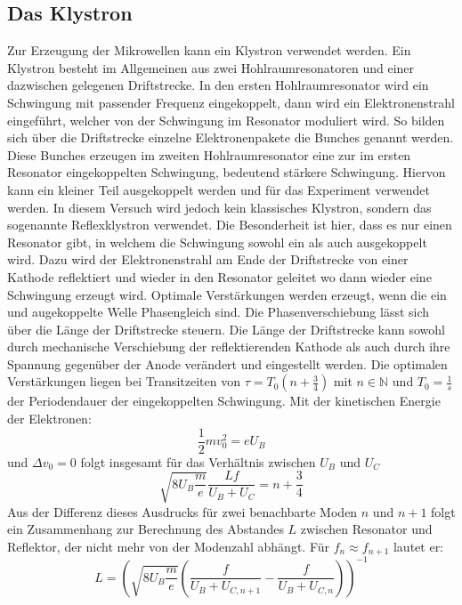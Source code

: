 \subsection{Das Klystron}
\label{sec:thklystron}
Zur Erzeugung der Mikrowellen kann ein Klystron verwendet werden. Ein Klystron besteht im Allgemeinen 
aus zwei Hohlraumresonatoren und einer dazwischen gelegenen Driftstrecke. In den ersten Hohlraumresonator 
wird ein Schwingung mit passender Frequenz eingekoppelt, dann wird ein Elektronenstrahl eingeführt, welcher 
von der Schwingung im Resonator moduliert wird. So bilden sich über die Driftstrecke 
einzelne Elektronenpakete die Bunches genannt werden. Diese Bunches erzeugen im zweiten Hohlraumresonator eine
zur im ersten Resonator eingekoppelten Schwingung, bedeutend stärkere Schwingung. Hiervon kann ein kleiner Teil 
ausgekoppelt werden und für das Experiment verwendet werden. In diesem Versuch wird jedoch kein klassisches
Klystron, sondern das sogenannte Reflexklystron verwendet. Die Besonderheit ist hier, dass es nur einen Resonator 
gibt, in welchem die Schwingung sowohl ein als auch ausgekoppelt wird. Dazu wird der Elektronenstrahl am Ende der 
Driftstrecke von einer Kathode reflektiert und wieder in den Resonator geleitet wo dann wieder eine Schwingung
erzeugt wird. Optimale Verstärkungen werden erzeugt, wenn die ein und augekoppelte Welle Phasengleich sind. 
Die Phasenverschiebung lässt sich über die Länge der Driftstrecke steuern. Die Länge der Driftstrecke kann 
sowohl durch mechanische Verschiebung der reflektierenden Kathode als auch durch ihre Spannung gegenüber 
der Anode verändert und eingestellt werden. Die optimalen Verstärkungen liegen bei Transitzeiten von
$\tau=T_0(n+\frac{3}{4})$ mit $n \in \mathbb{N}$ und $T_0=\frac{1}{s}$ der Periodendauer der eingekoppelten Schwingung.
Mit der kinetischen Energie der Elektronen:
\begin{equation}
    \frac{1}{2}mv_0^2=eU_B
\end{equation}
und $\Delta v_0=0$ folgt insgesamt für das Verhältnis zwischen $U_B$ und $U_C$
\begin{equation}
    \label{eq:resonatormode}
    \sqrt{8U_B\frac{m}{e}}\frac{Lf}{U_B+U_C}=n+\frac{3}{4}
\end{equation}
Aus der Differenz dieses Ausdrucks für zwei benachbarte Moden $n$ und $n+1$  folgt ein
Zusammenhang zur Berechnung des Abstandes $L$ zwischen Resonator und Reflektor, der
nicht mehr von der Modenzahl abhängt. Für $f_n \approx f_{n+1}$ lautet er:
\begin{equation}
    \label{eq:resonatorlange}
    L=\left( \sqrt{8U_B\frac{m}{e}}  \left(\frac{f}{U_B+U_{C,n+1}}-\frac{f}{U_B+U_{C,n}}\right)\right)^{-1}
\end{equation}
